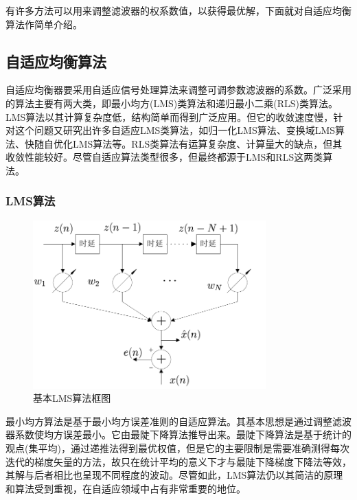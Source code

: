 有许多方法可以用来调整滤波器的权系数值，以获得最优解，下面就对自适应均衡算法作简单介绍。
\subsection{自适应均衡算法}
自适应均衡器要采用自适应信号处理算法来调整可调参数滤波器的系数。广泛采用的算法主要有两大类\citep{Simon2001}，即最小均方(LMS)类算法和递归最小二乘(RLS)类算法。LMS算法以其计算复杂度低，结构简单而得到广泛应用。但它的收敛速度慢，针对这个问题又研究出许多自适应LMS类算法，如归一化LMS算法、变换域LMS算法、快随自优化LMS算法等。RLS类算法有运算复杂度、计算量大的缺点，但其收敛性能较好。尽管自适应算法类型很多，但最终都源于LMS和RLS这两类算法。

\subsubsection*{LMS算法}
\begin{figure}[htb]
  \begin{center}
    \includegraphics[width=0.8\textwidth]{images/linearFilter.pdf}
  \end{center}
  \caption{基本LMS算法框图}
  \label{fig:2.2}
\end{figure}
最小均方算法是基于最小均方误差准则的自适应算法。其基本思想是通过调整滤波器系数使均方误差最小。它由最陡下降算法推导出来。最陡下降算法是基于统计的观点(集平均)，通过递推法得到最优权值，但是它的主要限制是需要准确测得每次迭代的梯度矢量的方法\citep{Simon2001}，故只在统计平均的意义下才与最陡下降梯度下降法等效，其解与后者相比也呈现不同程度的波动。尽管如此，LMS算法仍以其简洁的原理和算法受到重视，在自适应领域中占有非常重要的地位。

